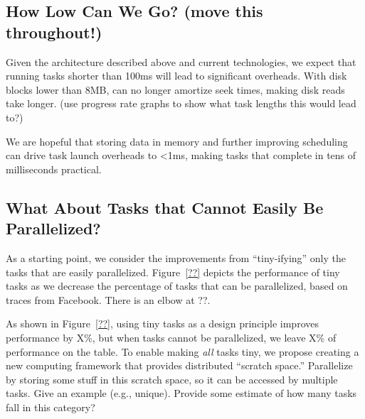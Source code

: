 {\subsection{How Low Can We Go? (move this throughout!)}
Given the architecture described above and current technologies, we expect that
running tasks shorter than 100ms will lead to significant overheads. With disk
blocks lower than 8MB, can no longer amortize seek times, making disk reads take
longer. (use progress rate graphs to show what task lengths this would lead to?)

We are hopeful that storing data in memory and further
improving scheduling can drive task launch overheads to <1ms, making tasks that
complete in tens of milliseconds practical.

\subsection{What About Tasks that Cannot Easily Be Parallelized?}
As a starting point, we consider the improvements from ``tiny-ifying'' only the
tasks that are easily parallelized.  Figure~\ref{??} depicts the performance of
tiny tasks as we decrease the percentage of tasks that can be parallelized, based
on traces from Facebook.  There is an elbow at ??.

As shown in Figure~\ref{??}, using tiny tasks as a design principle improves
performance by X\%, but when tasks cannot be parallelized, we leave X\% of
performance on the table.  To enable making \emph{all} tasks tiny, we propose
creating a new computing framework that provides distributed ``scratch space.''
Parallelize by storing some stuff in this scratch space, so it can be accessed
by multiple tasks.  Give an example (e.g., unique). Provide some estimate
of how many tasks fall in this category?
}
